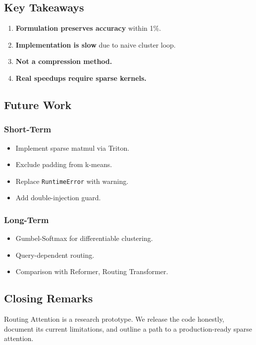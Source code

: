 \subsection{Key Takeaways}

\begin{enumerate}
\item \textbf{Formulation preserves accuracy} within 1\%.
\item \textbf{Implementation is slow} due to naive cluster loop.
\item \textbf{Not a compression method.}
\item \textbf{Real speedups require sparse kernels.}

\end{enumerate}
\subsection{Future Work}

\subsubsection{Short-Term}

\begin{itemize}
\item Implement sparse matmul via Triton.
\item Exclude padding from k-means.
\item Replace \texttt{RuntimeError} with warning.
\item Add double-injection guard.

\end{itemize}
\subsubsection{Long-Term}

\begin{itemize}
\item Gumbel-Softmax for differentiable clustering.
\item Query-dependent routing.
\item Comparison with Reformer, Routing Transformer.

\end{itemize}
\subsection{Closing Remarks}

Routing Attention is a research prototype. We release the code honestly, 
document its current limitations, and outline a path to a production-ready 
sparse attention.


